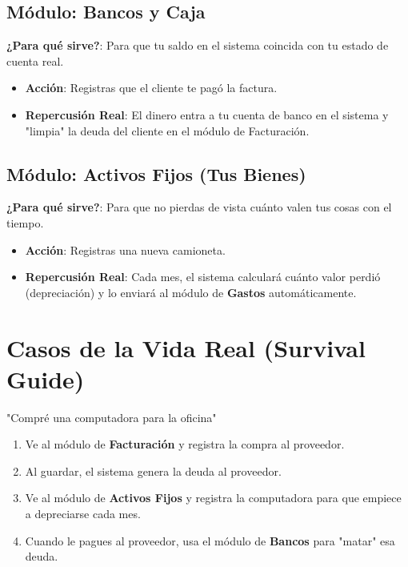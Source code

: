 \documentclass[12pt, a4paper, oneside]{book}
\begin{document}
\section{Módulo: Bancos y Caja}
\textbf{¿Para qué sirve?}: Para que tu saldo en el sistema coincida con tu estado de cuenta real.
\begin{itemize}
    \item \textbf{Acción}: Registras que el cliente te pagó la factura.
    \item \textbf{Repercusión Real}: El dinero entra a tu cuenta de banco en el sistema y "limpia" la deuda del cliente en el módulo de Facturación.
\end{itemize}

\section{Módulo: Activos Fijos (Tus Bienes)}
\textbf{¿Para qué sirve?}: Para que no pierdas de vista cuánto valen tus cosas con el tiempo.
\begin{itemize}
    \item \textbf{Acción}: Registras una nueva camioneta.
    \item \textbf{Repercusión Real}: Cada mes, el sistema calculará cuánto valor perdió (depreciación) y lo enviará al módulo de \textbf{Gastos} automáticamente.
\end{itemize}

\chapter{Casos de la Vida Real (Survival Guide)}

\begin{escenario}{"Compré una computadora para la oficina"}
    \begin{enumerate}
        \item Ve al módulo de \textbf{Facturación} y registra la compra al proveedor.
        \item Al guardar, el sistema genera la deuda al proveedor.
        \item Ve al módulo de \textbf{Activos Fijos} y registra la computadora para que empiece a depreciarse cada mes.
        \item Cuando le pagues al proveedor, usa el módulo de \textbf{Bancos} para "matar" esa deuda.
    \end{enumerate}
\end{escenario}
\end{document}
